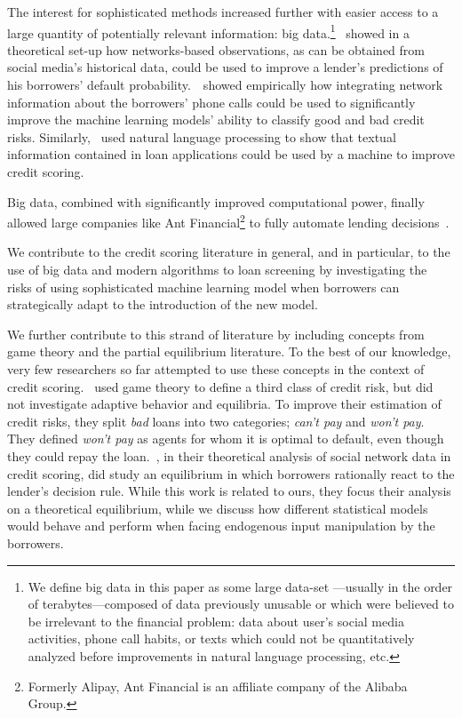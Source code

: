 \documentclass[12pt]{article} %
\begin{document}
The interest for sophisticated methods increased further with easier access to a large quantity of potentially relevant information: big data.\footnote{
We define big data in this paper as some large data-set ---usually in the order of terabytes---composed of data previously unusable or which were believed to be irrelevant to the financial problem: data about user's social media activities, phone call habits, or texts which could not be quantitatively analyzed before improvements in natural language processing, etc.
}~\cite{wei2016credit} showed in a theoretical set-up how networks-based observations, as can be obtained from social media's historical data, could be used to improve a lender's predictions of his borrowers' default probability.~\cite{oskarsdottir2019value}~showed empirically how integrating network information about the borrowers' phone calls could be used to significantly improve the machine learning models' ability to classify good and bad credit risks. Similarly,~\cite{netzer2019words} used natural language processing to show that textual information contained in loan applications could be used by a machine to improve credit scoring. 

Big data, combined with significantly improved computational power, finally allowed large companies like Ant Financial\footnote{Formerly Alipay, Ant Financial is an affiliate company of the Alibaba Group.} to fully automate lending decisions~\citep{zhao2017research}. 

We contribute to the credit scoring literature in general, and in particular, to the use of big data and modern algorithms to loan screening by investigating the risks of using sophisticated machine learning model when borrowers can strategically adapt to the introduction of the new model. 

We further contribute to this strand of literature by including concepts from game theory and the partial equilibrium literature. To the best of our knowledge, very few researchers so far attempted to use these concepts in the context of credit scoring.~\cite{bravo2015improving} used game theory to define a third class of credit risk, but did not investigate adaptive behavior and equilibria. To improve their estimation of credit risks, they split \textit{bad} loans into two categories; \textit{can't pay} and \textit{won't pay}. They defined \textit{won't pay} as agents for whom it is optimal to default, even though they could repay the loan.~\cite{wei2016credit}, in their theoretical analysis of social network data in credit scoring, did study an equilibrium in which borrowers rationally react to the lender's decision rule. While this work is related to ours, they focus their analysis on a theoretical equilibrium, while we discuss how different statistical models would behave and perform when facing endogenous input manipulation by the borrowers. 
\end{document}
